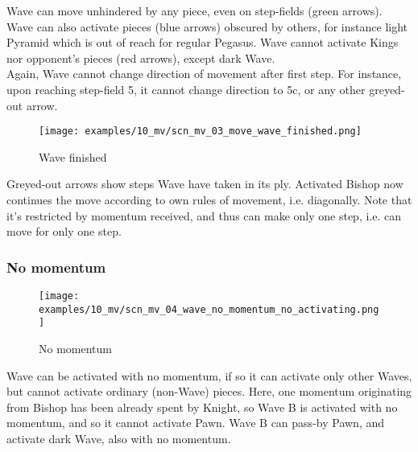 Wave can move unhindered by any piece, even on step-fields (green arrows). Wave
can also activate pieces (blue arrows) obscured by others, for instance light
Pyramid which is out of reach for regular Pegasus. Wave cannot activate Kings nor
opponent's pieces (red arrows), except dark Wave. \\
Again, Wave cannot change direction of movement after first step. For instance,
upon reaching step-field 5, it cannot change direction to 5c, or any other
greyed-out arrow.

\clearpage %

\noindent
\begin{figure}[h]
\texttt{[image: examples/10\_mv/scn\_mv\_03\_move\_wave\_finished.png]}
\caption{Wave finished}
\label{fig:scn_mv_03_move_wave_finished}
\end{figure}

Greyed-out arrows show steps Wave have taken in its ply. Activated Bishop
now continues the move according to own rules of movement, i.e. diagonally.
Note that it's restricted by momentum received, and thus can make only one
step, i.e. can move for only one step.

\clearpage %

\subsubsection*{No momentum}

\vspace*{-3.0ex}
\noindent
\begin{figure}[h]
\texttt{[image: examples/10\_mv/scn\_mv\_04\_wave\_no\_momentum\_no\_activating.png]}
\caption{No momentum}
\label{fig:scn_mv_04_wave_no_momentum_no_activating}
\end{figure}

Wave can be activated with no momentum, if so it can activate only other Waves, but
cannot activate ordinary (non-Wave) pieces. Here, one momentum originating from Bishop
has been already spent by Knight, so Wave B is activated with no momentum, and so it
cannot activate Pawn. Wave B can pass-by Pawn, and activate dark Wave, also with no
momentum.

